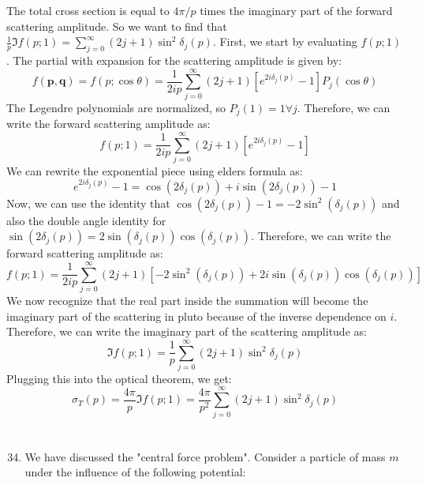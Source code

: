 \documentclass[12pt]{article}
\begin{document}
The total cross section is equal to $4 \pi / p$ times the imaginary part of the forward scattering amplitude. So we want to find that $\frac{1}{p} \Im f(p ; 1)= \sum_{j=0}^{\infty}(2 j+1) \sin ^{2} \delta_{j}(p)$. First, we start by evaluating $f(p ; 1)$. The partial with expansion for the scattering amplitude is given by:
\begin{equation}
f(\mathbf{p}, \mathbf{q})=f(p ; \cos \theta)=\frac{1}{2 i p} \sum_{j=0}^{\infty}(2 j+1)\left[e^{2 i \delta_j(p)}-1\right] P_j(\cos \theta)
\end{equation}
The Legendre polynomials are normalized, so $P_{j}(1)=1 \forall j$. Therefore, we can write the forward scattering amplitude as:
\begin{equation}
f(p ; 1)=\frac{1}{2 i p} \sum_{j=0}^{\infty}(2 j+1)\left[e^{2 i \delta_j(p)}-1\right]
\end{equation}
We can rewrite the exponential piece using elders formula as:
\begin{equation}
e^{2 i \delta_j(p)}-1=\cos (2 \delta_j(p))+i \sin (2 \delta_j(p))-1
\end{equation}
Now, we can use the identity that $\cos(2\delta _{j}(p))-1=-2\sin^{2}(\delta_{j}(p))$ and also the double angle identity for $\sin(2\delta_{j}(p))= 2\sin(\delta_{j}(p))\cos(\delta_{j}(p))$. Therefore, we can write the forward scattering amplitude as:
\begin{equation}
f(p ; 1)=\frac{1}{2 i p} \sum_{j=0}^{\infty}(2 j+1)\left[-2\sin^{2}(\delta_{j}(p))+2i\sin(\delta_{j}(p))\cos(\delta_{j}(p))\right]
\end{equation}
We now recognize that the real part inside the summation will become the imaginary part of the scattering in pluto because of the inverse dependence on $i$. Therefore, we can write the imaginary part of the scattering amplitude as:
\begin{equation}
\Im f(p ; 1)=\frac{1}{ p} \sum_{j=0}^{\infty}(2 j+1) \sin ^{2} \delta_{j}(p)
\end{equation}
Plugging this into the optical theorem, we get:
\begin{equation}
\sigma_T(p)=\frac{4 \pi}{p} \Im f(p ; 1)=\frac{4 \pi}{p^{2}} \sum_{j=0}^{\infty}(2 j+1) \sin ^{2} \delta_{j}(p)
\end{equation}
\section{}
\begin{enumerate}
  \setcounter{enumi}{33}
  \item We have discussed the "central force problem". Consider a particle of mass $m$ under the influence of the following potential:
\end{enumerate}
\end{document}

